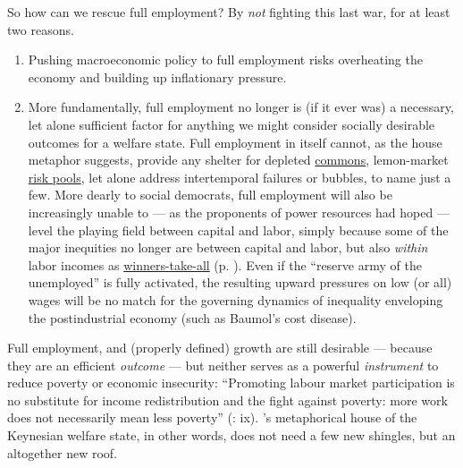 \begin{description}
	So how can we rescue full employment? By \emph{not} fighting this last war, for at least two reasons.
	
	\begin{enumerate}
		\item Pushing macroeconomic policy to full employment risks overheating the economy and building up inflationary pressure.
		\item More fundamentally, full employment no longer is (if it ever was) a necessary, let alone sufficient factor for anything we might consider socially desirable outcomes for a welfare state. Full employment in itself cannot, as the house metaphor suggests, provide any shelter for depleted \hyperref[sec:common_good]{commons}, lemon-market \hyperref[sec:adverse_selection]{risk pools}, let alone address intertemporal failures or bubbles, to name just a few. More dearly to social democrats, full employment will also be increasingly unable to --- as the proponents of power resources had hoped --- level the playing field between capital and labor, simply because some of the major inequities no longer are between capital and labor, but also \emph{within} labor incomes as \hyperref[sec:winner-take-all]{winners-take-all} (p. \pageref{sec:winner-take-all}). Even if the ``reserve army of the unemployed'' is fully activated, the resulting upward pressures on low (or all) wages will be no match for the governing dynamics of inequality enveloping the postindustrial economy (such as Baumol's cost disease). 	
	\end{enumerate}
	
	Full employment, and (properly defined) growth are still desirable --- because they are an efficient \emph{outcome} --- but neither serves as a powerful \emph{instrument} to reduce poverty or economic insecurity: ``Promoting labour market participation is no substitute for income redistribution and the fight against poverty: more work does not necessarily mean less poverty'' (\citealt{Esping-Andersen2002}: ix). \citeauthor{Offe2003}'s metaphorical house of the Keynesian welfare state, in other words, does not need a few new shingles, but an altogether new roof. 
	

\end{description}
